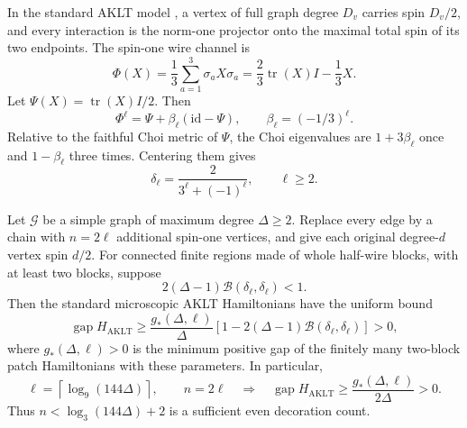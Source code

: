 In the standard AKLT model \cite{q:AKLT1988}, a vertex of full graph degree $D_v$ carries
spin $D_v/2$, and every interaction is the norm-one projector onto the
maximal total spin of its two endpoints.  The spin-one wire channel is
\[
 \Phi(X)=\frac13\sum_{a=1}^3\sigma_aX\sigma_a
 =\frac23\operatorname{tr}(X)I-\frac13X.
\]
Let $\Psi(X)=\operatorname{tr}(X)I/2$.  Then
\[
 \Phi^\ell=\Psi+\beta_\ell(\mathrm{id}-\Psi),\qquad
 \beta_\ell=(-1/3)^\ell.
\]
Relative to the faithful Choi metric of $\Psi$, the Choi eigenvalues
are $1+3\beta_\ell$ once and $1-\beta_\ell$ three times.  Centering
them gives
\begin{equation}
 \delta_\ell=\frac{2}{3^\ell+(-1)^\ell},\qquad\ell\geq2.
 \label{q:aklt-radius}
\end{equation}

\begin{corollary}
\label{q:cor-aklt}
Let $\mathcal G$ be a simple graph of maximum degree $\Delta\geq2$.
Replace every edge by a chain with $n=2\ell$ additional spin-one
vertices, and give each original degree-$d$ vertex spin $d/2$.
For connected finite regions made of whole half-wire blocks, with at
least two blocks, suppose
\[
 2(\Delta-1)\mathcal B(\delta_\ell,\delta_\ell)<1.
\]
Then the standard microscopic AKLT Hamiltonians have the uniform bound
\begin{equation}
 \operatorname{gap}H_{\mathrm{AKLT}}
 \geq\frac{g_*(\Delta,\ell)}\Delta
       \left[1-2(\Delta-1)
                    \mathcal B(\delta_\ell,\delta_\ell)\right]>0,
 \label{q:aklt-gap}
\end{equation}
where $g_*(\Delta,\ell)>0$ is the minimum positive gap of the finitely
many two-block patch Hamiltonians with these parameters.  In particular,
\begin{equation}
 \ell=\left\lceil\log_9(144\Delta)\right\rceil,
 \qquad n=2\ell
 \quad\Longrightarrow\quad
 \operatorname{gap}H_{\mathrm{AKLT}}
 \geq\frac{g_*(\Delta,\ell)}{2\Delta}>0.
 \label{q:log-decoration}
\end{equation}
Thus $n<\log_3(144\Delta)+2$ is a sufficient even decoration count.
\end{corollary}

